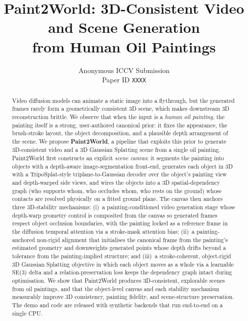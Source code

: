 \documentclass[10pt,twocolumn,letterpaper]{article}
\title{Paint2World: 3D-Consistent Video and Scene Generation\\from Human Oil Paintings}
\author{
Anonymous ICCV Submission\\
Paper ID \texttt{XXXX}
}
\begin{document}
\maketitle

\begin{abstract}
Video diffusion models can animate a static image into a flythrough, but the
generated frames rarely form a geometrically consistent 3D scene, which makes
downstream 3D reconstruction brittle. We observe that when the input is a
\emph{human oil painting}, the painting itself is a strong, user-authored
canonical prior: it fixes the appearance, the brush-stroke layout, the object
decomposition, and a plausible depth arrangement of the scene. We propose
\textbf{Paint2World}, a pipeline that exploits this prior to generate
3D-consistent video and a 3D Gaussian Splatting scene from a single oil
painting. Paint2World first constructs an explicit \emph{scene canvas}: it
segments the painting into objects with a depth-aware image-segmentation
front-end, generates each object in 3D with a TripoSplat-style
triplane-to-Gaussian decoder over the object's painting view and
depth-warped side views, and wires the objects into a 3D spatial-dependency
graph (who supports whom, who occludes whom, who rests on the ground) whose
contacts are resolved physically on a fitted ground plane. The canvas then
anchors three 3D-stability mechanisms: (i)~a painting-conditioned video
generation stage whose depth-warp geometry control is composited from the
canvas so generated frames respect object occlusion boundaries, with the
painting locked as a reference frame in the diffusion temporal attention via
a stroke-mask attention bias; (ii)~a painting-anchored non-rigid alignment
that initialises the canonical frame from the painting's estimated geometry
and downweights generated points whose depth drifts beyond a tolerance from
the painting-implied structure; and (iii)~a stroke-coherent, object-rigid 3D
Gaussian Splatting objective in which each object moves as a whole via a
learnable SE(3) delta and a relation-preservation loss keeps the dependency
graph intact during optimisation. We show that Paint2World produces
3D-consistent, explorable scenes from oil paintings, and that the object-level
canvas and each stability mechanism measurably improve 3D consistency,
painting fidelity, and scene-structure preservation. The demo and code are
released with synthetic backends that run end-to-end on a single CPU.
\end{abstract}
\end{document}
